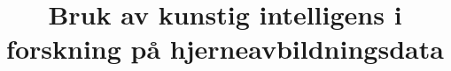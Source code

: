 \documentclass[aspectratio=169]{beamer}
\title{Bruk av kunstig intelligens i forskning på hjerneavbildningsdata}
\begin{document}
	\begin{frame}
	 	\titlepage
	\end{frame}

    
    
    
    
\end{document}
